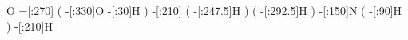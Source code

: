            O%
    =[:270]%
              (
        -[:330]O%
         -[:30]H%
              )
    -[:210]%
              (
      -[:247.5]H%
              )
              (
      -[:292.5]H%
              )
    -[:150]N%
              (
         -[:90]H%
              )
    -[:210]H%